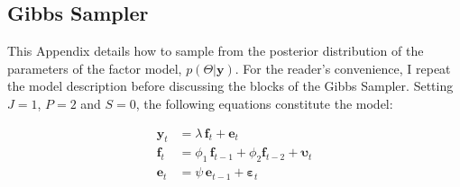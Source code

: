 \documentclass[notitlepage,a4paper,12pt]{article}
\begin{document}
\begin{ThreePartTable}
\pagebreak
\newpage

\section{Gibbs Sampler}

\normalsize
This Appendix details how to sample from the posterior distribution of the parameters of the factor model, $p(\Theta|\mathbf{y})$. For the reader's convenience, I repeat the model description before discussing the blocks of the Gibbs Sampler. Setting $J=1$, $P=2$ and $S=0$, the following equations constitute the model:

\begin{subequations}
    \label{eqn:app_model}
    \begin{align}
        \mathbf{y}_t &=  \lambda \, \mathbf{f}_{t} + \mathbf{e}_t \label{eqn:app_facmod_obs}\\ 
        \mathbf{f}_t &= \phi_1 \, \mathbf{f}_{t-1} + \phi_2 \mathbf{f}_{t-2} + \boldsymbol{\upsilon}_t \label{eqn:app_facmod_factors}\\
        \mathbf{e}_t &= \psi \, \mathbf{e}_{t-1} + \boldsymbol{\varepsilon}_t \label{eqn:app_facmod_idios}
    \end{align}
\end{subequations}


\end{ThreePartTable}
\end{document}
